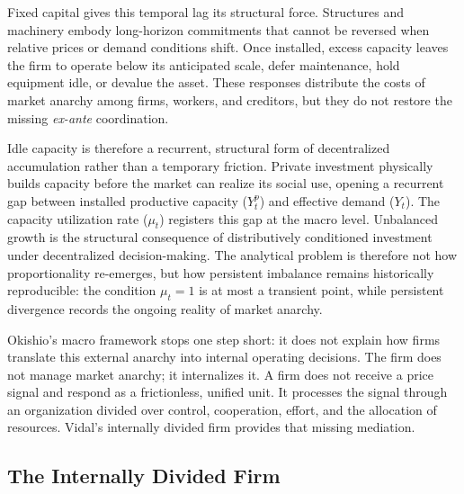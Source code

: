Fixed capital gives this temporal lag its structural force.
Structures and machinery embody long-horizon commitments that
cannot be reversed when relative prices or demand conditions
shift. Once installed, excess capacity leaves the firm to
operate below its anticipated scale, defer maintenance, hold
equipment idle, or devalue the asset. These responses
distribute the costs of market anarchy among firms, workers,
and creditors, but they do not restore the missing
\textit{ex-ante} coordination.

Idle capacity is therefore a recurrent, structural form of
decentralized accumulation rather than a temporary friction.
Private investment physically builds capacity before the market
can realize its social use, opening a recurrent gap
between installed productive capacity ($Y^p_t$) and effective demand ($Y_t$). The capacity utilization rate ($\mu_t$) registers this gap at the macro level. Unbalanced growth is the structural consequence of distributively conditioned investment under
decentralized decision-making. The analytical problem is
therefore not how proportionality re-emerges, but how persistent
imbalance remains historically reproducible: the condition
$\mu_t = 1$ is at most a transient point, while persistent
divergence records the ongoing reality of market anarchy.

Okishio's macro framework stops one step short: it does not explain how firms translate this external anarchy into internal operating decisions. The firm does not manage market anarchy; it internalizes it. A firm does not receive a price signal and respond as a frictionless, unified unit. It processes the signal through an organization divided over control, cooperation,
effort, and the allocation of resources. Vidal's internally
divided firm provides that missing mediation.

\subsection{The Internally Divided Firm}


